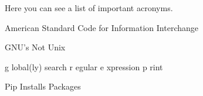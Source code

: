 %
%

Here you can see a list of important acronyms.
\begin{description}[list]
\item[ASCII]{American Standard Code for Information Interchange}
\item[GNU]{GNU's Not Unix}
\item[grep]{g lobal(ly) search r egular e xpression p rint}
\item[pip]{Pip Installs Packages}
\end{description}